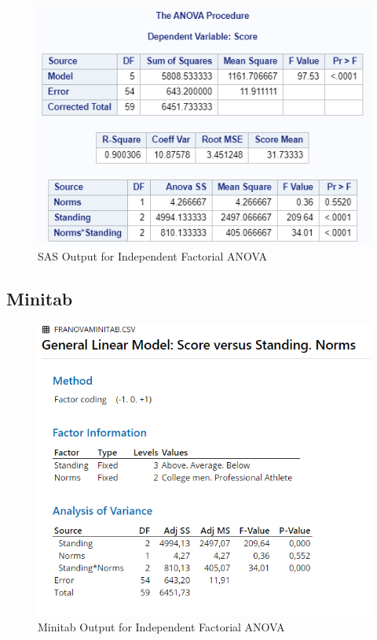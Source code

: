 \documentclass[
]{book}
\begin{document}
\begin{figure}[!h]
\includegraphics{Screenshots/Factorial Independent ANOVA/FIanovaSAS} \caption{\label{fig:FIanovaSAS}SAS Output for Independent Factorial ANOVA}\label{fig:FIanovaSAS}
\end{figure}

\hypertarget{minitab-1}{%
\subsection{Minitab}\label{minitab-1}}

\begin{figure}[!h]
\includegraphics{Screenshots/Factorial Independent ANOVA/FIanovaMinitab} \caption{\label{fig:FIanovaMinitab}Minitab Output for Independent Factorial ANOVA}\label{fig:FIanovaMinitab}
\end{figure}
\end{document}
